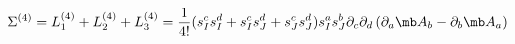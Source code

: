 \begin{equation}
\Sigma^{(4)}=L_1^{(4)}+L_2^{(4)}+L_3^{(4)}=  \frac{1}{4!}(s_{I}^{c} s_{I}^{d}+ s_{I}^{c} s_{J}^{d}+s_{J}^{c}s_{J}^{d})s_{I}^{a}s_{J}^{b}     \partial_c\partial_d\,(\partial_a {\mb A}_b-\partial_b {\mb A}_a)
\end{equation}

